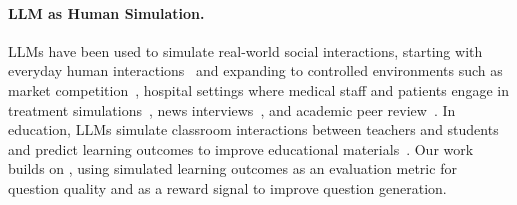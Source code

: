 \paragraph{LLM as Human Simulation.}
LLMs have been used to simulate real-world social interactions, starting with everyday human interactions~\cite{park2024generative, maharana-etal-2024-evaluating, lee2025realtalk} and expanding to controlled environments such as market competition~\cite{zhaocompeteai}, hospital settings where medical staff and patients engage in treatment simulations~\cite{li2024agent, schmidgall2024agentclinic}, news interviews~\cite{lu2024newsinterviewdatasetplaygroundevaluate}, and academic peer review~\cite{jin2024agentreview}.
In education, LLMs simulate classroom interactions between teachers and students~\cite{zhang2024simulating} and predict learning outcomes to improve educational materials~\cite{he2024evaluating}.
Our work builds on \citet{he2024evaluating}, using simulated learning outcomes as an evaluation metric for question quality and as a reward signal to improve question generation.




